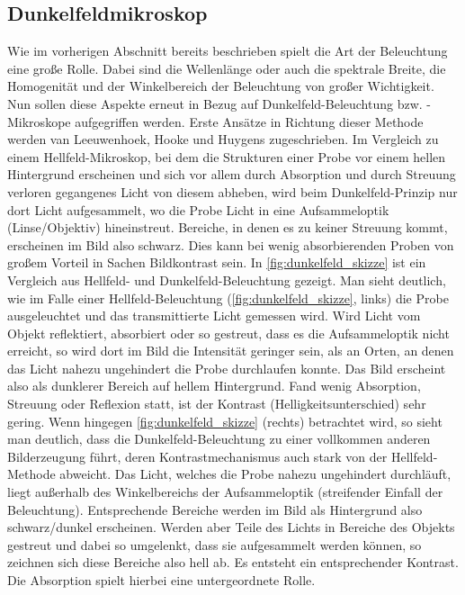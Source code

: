 \documentclass[ngerman]{scrartcl}
\begin{document}
\subsection{Dunkelfeldmikroskop}
\label{subsec:dunkelfeldmikroskop_grundlagen}

Wie im vorherigen Abschnitt bereits beschrieben spielt die Art der Beleuchtung eine große Rolle. Dabei sind die Wellenlänge oder auch die spektrale Breite, die Homogenität und der Winkelbereich der Beleuchtung von großer Wichtigkeit. Nun sollen diese Aspekte erneut in Bezug auf Dunkelfeld-Beleuchtung bzw. -Mikroskope aufgegriffen werden. Erste Ansätze in Richtung dieser Methode werden van Leeuwenhoek, Hooke und Huygens zugeschrieben. Im Vergleich zu einem Hellfeld-Mikroskop, bei dem die Strukturen einer Probe vor einem hellen Hintergrund erscheinen und sich vor allem durch Absorption und durch Streuung verloren gegangenes Licht von diesem abheben, wird beim Dunkelfeld-Prinzip nur dort Licht aufgesammelt, wo die Probe Licht in eine Aufsammeloptik (Linse/Objektiv) hineinstreut. Bereiche, in denen es zu keiner Streuung kommt, erscheinen im Bild also schwarz. Dies kann bei wenig absorbierenden Proben von großem Vorteil in Sachen Bildkontrast sein. In \autoref{fig:dunkelfeld_skizze} ist ein Vergleich aus Hellfeld- und Dunkelfeld-Beleuchtung gezeigt. Man sieht deutlich, wie im Falle einer Hellfeld-Beleuchtung (\autoref{fig:dunkelfeld_skizze}, links) die Probe ausgeleuchtet und das transmittierte Licht gemessen wird. Wird Licht vom Objekt reflektiert, absorbiert oder so gestreut, dass es die Aufsammeloptik nicht erreicht, so wird dort im Bild die Intensität geringer sein, als an Orten, an denen das Licht nahezu ungehindert die Probe durchlaufen konnte. Das Bild erscheint also als dunklerer Bereich auf hellem Hintergrund. Fand wenig Absorption, Streuung oder Reflexion statt, ist der Kontrast (Helligkeitsunterschied) sehr gering. Wenn hingegen \autoref{fig:dunkelfeld_skizze} (rechts) betrachtet wird, so sieht man deutlich, dass die Dunkelfeld-Beleuchtung zu einer vollkommen anderen Bilderzeugung führt, deren Kontrastmechanismus auch stark von der Hellfeld-Methode abweicht. Das Licht, welches die Probe nahezu ungehindert durchläuft, liegt außerhalb des Winkelbereichs der Aufsammeloptik (streifender Einfall der Beleuchtung). Entsprechende Bereiche werden im Bild als Hintergrund also schwarz/dunkel erscheinen. Werden aber Teile des Lichts in Bereiche des Objekts gestreut und dabei so umgelenkt, dass sie aufgesammelt werden können, so zeichnen sich diese Bereiche also hell ab. Es entsteht ein entsprechender Kontrast. Die Absorption spielt hierbei eine untergeordnete Rolle.
\end{document}
